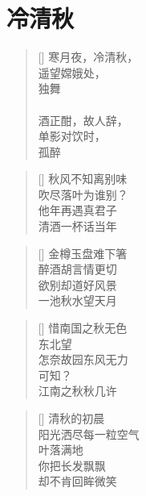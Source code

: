 \chapter{冷清秋}
\thispagestyle{empty}
\renewcommand{\poemtoc}{subsection}
\settowidth{\versewidth}{寒月夜，冷清秋}
\begin{verse}[\versewidth]
寒月夜，冷清秋，\\
遥望嫦娥处，\\
独舞\\
~\\
酒正酣，故人辞，\\
单影对饮时，\\
孤醉
\end{verse}

\renewcommand{\poemtoc}{subsection}
\settowidth{\versewidth}{秋风不知离别味}
\begin{verse}[\versewidth]
秋风不知离别味\\
吹尽落叶为谁别？\\
他年再遇真君子\\
清酒一杯话当年
\end{verse}

\renewcommand{\poemtoc}{subsection}
\settowidth{\versewidth}{秋风不知离别味}
\begin{verse}[\versewidth]
金樽玉盘难下箸\\
醉酒胡言情更切\\
欲别却道好风景\\
一池秋水望天月
\end{verse}

\renewcommand{\poemtoc}{subsection}
\settowidth{\versewidth}{惜南国之秋无色}
\begin{verse}[\versewidth]
惜南国之秋无色\\
东北望\\
怎奈故园东风无力\\
可知？\\
江南之秋秋几许
\end{verse}
\newpage

\renewcommand{\poemtoc}{subsection}
\settowidth{\versewidth}{清秋的初晨}
\begin{verse}[\versewidth]
清秋的初晨\\
阳光洒尽每一粒空气\\
叶落满地\\
你把长发飘飘\\
却不肯回眸微笑
\end{verse}
